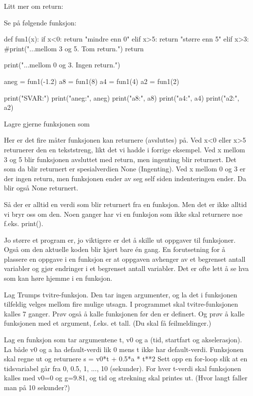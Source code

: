 Litt mer om return:

Se på følgende funksjon: 

\begin{usncodebox}
def fun1(x):
   if x<0:
      return "mindre enn 0"
   elif x>5:
      return "større enn 5"
   elif x>3: 
      #print("...mellom 3 og 5. Tom return.")
      return

   print("...mellom 0 og 3. Ingen return.")

aneg = fun1(-1.2)
a8 = fun1(8)
a4 = fun1(4)
a2 = fun1(2)

print("SVAR:") 
print("aneg:", aneg)
print("a8:", a8)
print("a4:", a4)
print("a2:", a2)
\end{usncodebox}

Lagre gjerne funksjonen som 

Her er det fire måter funksjonen kan returnere (avsluttes) på. Ved x<0 eller x>5 returnerer den en tekststreng, likt det vi hadde i forrige eksempel. Ved x mellom 3 og 5 blir funksjonen avsluttet med return, men ingenting blir returnert. Det som da blir returnert er spesialverdien None (Ingenting). Ved x mellom 0 og 3 er der ingen return, men funksjonen ender av seg self siden 
indenteringen ender. Da blir også None returnert.

Så der er alltid en verdi som blir returnert fra en funksjon. Men det er ikke alltid vi bryr oss om den. Noen ganger har vi en funksjon som ikke skal returnere noe f.eks. print().

Jo større et program er, jo viktigere er det å skille ut oppgaver til funksjoner. Også om den aktuelle koden blir kjørt bare én gang. En forutsetning for å plassere en oppgave i en funksjon er at oppgaven avhenger av et begrenset antall variabler og gjør endringer i et begrenset antall variabler. Det er ofte lett å se hva som kan høre hjemme i en funksjon. 

\begin{exercise}
Lag Trumps tvitre-funksjon. Den tar ingen argumenter, og la det i funksjonen tilfeldig velges mellom fire mulige utsagn. I programmet skal tvitre-funksjonen kalles 7 ganger. Prøv også å kalle funksjonen før den er definert. Og prøv å kalle funksjonen med et argument, f.eks. et tall. (Du skal få feilmeldinger.) 
\end{exercise}

\begin{exercise}
Lag en funksjon som tar argumentene t, v0 og a (tid, startfart og akselerasjon). La både v0 og a ha default-verdi lik 0 mens t ikke har default-verdi. Funksjonen skal regne ut og returnere  s = v0*t + 0.5*a * t**2 Sett opp en for-loop slik at en tidsvariabel går fra 0, 0.5, 1, ..., 10 (sekunder). For hver t-verdi skal funksjonen kalles med v0=0 og g=9.81, og tid og strekning skal printes ut. (Hvor langt faller man på 10 sekunder?)
\end{exercise}

